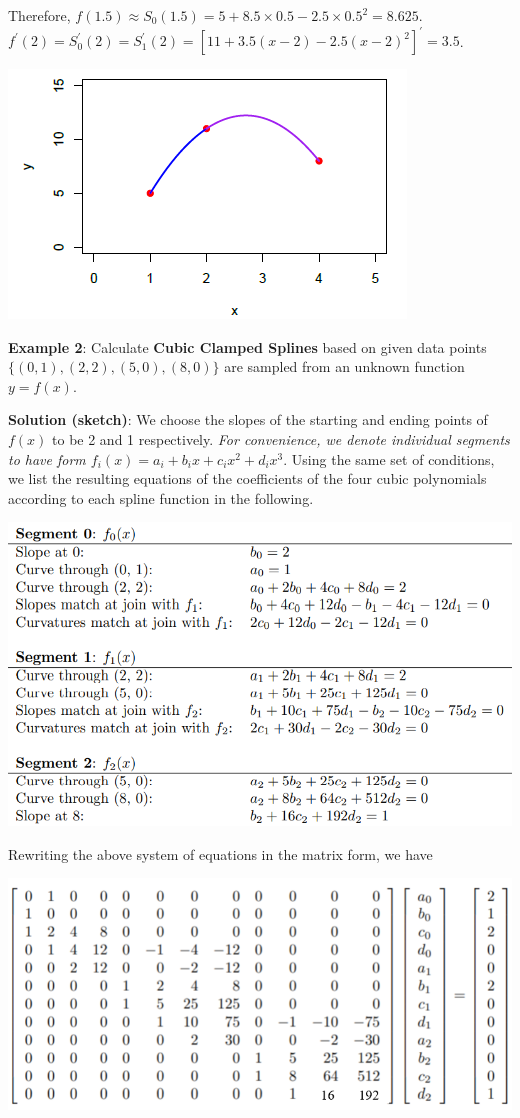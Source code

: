 \documentclass[
]{book}
\begin{document}
Therefore, \(f(1.5) \approx S_0(1.5) = 5 + 8.5\times 0.5 -2.5\times 0.5^2 = 8.625\). \(f^\prime(2) = S^\prime_0(2) = S^\prime_1(2) = [11 + 3.5(x-2) -2.5(x-2)^2]^\prime = 3.5\).

\begin{center}\includegraphics[width=0.45\linewidth]{img11/14-cubicNaturalSplineCurveR} \end{center}

\hfill\break

\textbf{Example 2}: Calculate \textbf{\color{red} Cubic Clamped Splines} based on given data points \(\{(0,1), (2,2), (5,0), (8,0)\}\) are sampled from an unknown function \(y = f(x)\).

\hfill\break
\textbf{Solution (sketch)}: We choose the slopes of the starting and ending points of \(f(x)\) to be 2 and 1 respectively. \emph{\color{red} For convenience, we denote individual segments to have form \(f_i(x) = a_i +b_ix + c_ix^2 + d_ix^3\)}. Using the same set of conditions, we list the resulting equations of the coefficients of the four cubic polynomials according to each spline function in the following.

\begin{center}\includegraphics[width=0.75\linewidth]{img11/14-ClumedSplineExample5-eqs} \end{center}

Rewriting the above system of equations in the matrix form, we have

\begin{center}\includegraphics[width=0.65\linewidth]{img11/15-ClumedSplineExample5-MatrixEqs} \end{center}
\end{document}
